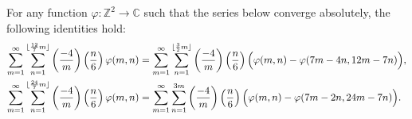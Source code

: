 \documentclass[10pt,a4paper]{amsart}
\begin{document}
\begin{lemma} \label{lem:double_ser_trans}
For any function $\varphi:\mathbb{Z}^2 \rightarrow \mathbb{C}$ such that the series below converge absolutely, the following identities hold:
\begin{align}
\sum_{m=1}^\infty \sum_{n=1}^{\lfloor {12 \over 7}m \rfloor} \left({-4 \over m}\right) \left({n \over 6}\right) \varphi(m,n) &= \sum_{m=1}^\infty \sum_{n=1}^{\lfloor {3 \over 2}m \rfloor} \left({-4 \over m}\right) \left({n \over 6}\right) \Big( \varphi(m,n) - \varphi(7m-4n,12m-7n) \Big), \label{eqn:double_ser_trans1} \\
\sum_{m=1}^\infty \sum_{n=1}^{\lfloor {24 \over 7}m \rfloor} \left({-4 \over m}\right) \left({n \over 6}\right) \varphi(m,n) &= \sum_{m=1}^\infty \sum_{n=1}^{3m} \left({-4 \over m}\right) \left({n \over 6}\right) \Big( \varphi(m,n) - \varphi(7m-2n,24m-7n) \Big). \label{eqn:double_ser_trans2}
\end{align}
\end{lemma}
\end{document}
